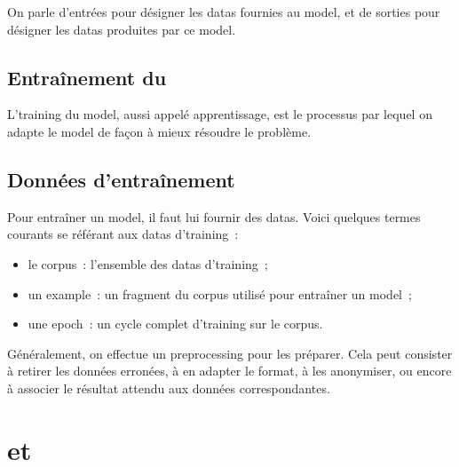 On parle d'entrées pour désigner les \glspl{data} fournies au \gls{model}, et de sorties pour désigner les \glspl{data} produites par ce \gls{model}.

\subsection{Entraînement du }
\label{def:training}
L'\gls{training} du \gls{model}, aussi appelé apprentissage, est le processus par lequel on adapte le \gls{model} de façon à mieux résoudre le problème.

\subsection{Données d'entraînement}
\label{def:preprocessing} \label{def:corpus} \label{def:data} \label{def:example} \label{def:epoch}
Pour entraîner un \gls{model}, il faut lui fournir des \glspl{data}.
%
Voici quelques termes courants se référant aux \glspl{data} d'\gls{training}~:
\begin{itemize}
	\item le \gls{corpus}~: l'ensemble des \glspl{data} d'\gls{training}~;
	\item un \gls{example}~: un fragment du \gls{corpus} utilisé pour entraîner un \gls{model}~;
	\item une \gls{epoch}~: un cycle complet d'\gls{training} sur le \gls{corpus}.
\end{itemize}
\vspace{1em}

Généralement, on effectue un \gls{preprocessing} pour les préparer. Cela peut consister à retirer les données erronées, à en adapter le format, à les anonymiser, ou encore à associer le résultat attendu aux données correspondantes.

\section{ et }
